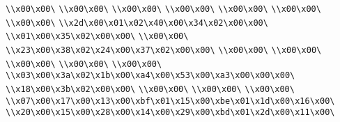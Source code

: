 \verb|\\x00\x00\|\newline
\verb|\\x00\x00\|\newline
\verb|\\x00\x00\|\newline
\verb|\\x00\x00\|\newline
\verb|\\x00\x00\|\newline
\verb|\\x00\x00\|\newline
\verb|\\x00\x00\|\newline
\verb|\\x2d\x00\x01\x02\x40\x00\x34\x02\x00\x00\|\newline
\verb|\\x01\x00\x35\x02\x00\x00\|\newline
\verb|\\x00\x00\|\newline
\verb|\\x23\x00\x38\x02\x24\x00\x37\x02\x00\x00\|\newline
\verb|\\x00\x00\|\newline
\verb|\\x00\x00\|\newline
\verb|\\x00\x00\|\newline
\verb|\\x00\x00\|\newline
\verb|\\x00\x00\|\newline
\verb|\\x03\x00\x3a\x02\x1b\x00\xa4\x00\x53\x00\xa3\x00\x00\x00\|\newline
\verb|\\x18\x00\x3b\x02\x00\x00\|\newline
\verb|\\x00\x00\|\newline
\verb|\\x00\x00\|\newline
\verb|\\x00\x00\|\newline
\verb|\\x07\x00\x17\x00\x13\x00\xbf\x01\x15\x00\xbe\x01\x1d\x00\x16\x00\|\newline
\verb|\\x20\x00\x15\x00\x28\x00\x14\x00\x29\x00\xbd\x01\x2d\x00\x11\x00\|\newline
